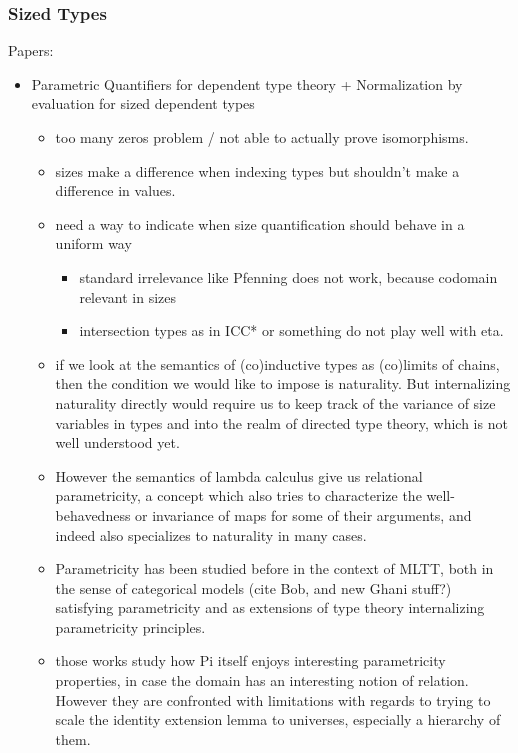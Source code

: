 \documentclass{book}
\begin{document}
\subsubsection{Sized Types}
Papers:
\begin{itemize}
\item Parametric Quantifiers for dependent type theory + Normalization by evaluation for sized dependent types
    \begin{itemize}
    \item too many zeros problem / not able to actually prove isomorphisms.
    \item sizes make a difference when indexing types but shouldn't make a difference in values.
    \item need a way to indicate when size quantification should behave in a uniform way
      \begin{itemize}
      \item standard irrelevance like Pfenning does not work, because codomain relevant in sizes
      \item intersection types as in ICC* or something do not play well with eta.
      \end{itemize}

    \item if we look at the semantics of (co)inductive types as (co)limits
    of chains, then the condition we would like to impose is
    naturality. But internalizing naturality directly would require us
    to keep track of the variance of size variables in types and into
    the realm of directed type theory, which is not well understood
    yet.

    \item However the semantics of lambda calculus give us relational
    parametricity, a concept which also tries to characterize the
    well-behavedness or invariance of maps for some of their
    arguments, and indeed also specializes to naturality in many cases.

    \item Parametricity has been studied before in the context of MLTT,
    both in the sense of categorical models (cite Bob, and new Ghani
    stuff?) satisfying parametricity and as extensions of type theory
    internalizing parametricity principles.

    \item those works study how Pi itself enjoys interesting parametricity
    properties, in case the domain has an interesting notion of
    relation. However they are confronted with limitations with
    regards to trying to scale the identity extension lemma to
    universes, especially a hierarchy of them.


\end{itemize}
\end{itemize}
\end{document}
